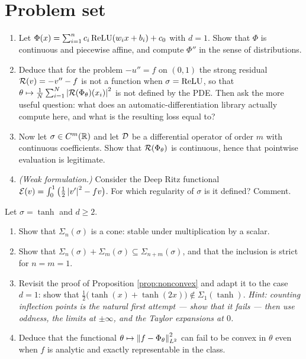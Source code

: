 \documentclass[11pt,a4paper]{article}
\begin{document}
\newpage
\section{Problem set}

\begin{exercise}\label{ex:relu}
\leavevmode
\begin{enumerate}[label=\textbf{\arabic*.}]
\item Let $\Phi(x) = \sum_{i=1}^n c_i \operatorname{ReLU}(w_i x + b_i) + c_0$ with $d = 1$. Show that $\Phi$ is
continuous and piecewise affine, and compute $\Phi''$ in the sense of distributions.
\item Deduce that for the problem $-u'' = f$ on $(0,1)$ the strong residual $\mathcal{R}(v) = -v'' - f$ is
not a function when $\sigma = \operatorname{ReLU}$, so that
$\theta \mapsto \frac1N \sum_{i=1}^N \left\lvert \mathcal{R}(\Phi_\theta)(x_i) \right\rvert^2$ is not defined by the PDE. Then
ask the more useful question: what does an automatic-differentiation library actually compute here,
and what is the resulting loss equal to?
\item Now let $\sigma \in C^m(\mathbb{R})$ and let $\mathcal{D}$ be a differential operator of order $m$ with
continuous coefficients. Show that $\mathcal{R}(\Phi_\theta)$ is continuous, hence that pointwise evaluation
is legitimate.
\item \emph{(Weak formulation.)} Consider the Deep Ritz functional
$\mathcal{E}(v) = \int_0^1 \big( \tfrac12 \left\lvert v' \right\rvert^2 - f v \big)$. For which regularity of $\sigma$ is it
defined? Comment.
\end{enumerate}
\end{exercise}

\begin{exercise}\label{ex:structure}
Let $\sigma = \tanh$ and $d \ge 2$.
\begin{enumerate}[label=\textbf{\arabic*.}]
\item Show that $\Sigma_n(\sigma)$ is a cone: stable under multiplication by a scalar.
\item Show that $\Sigma_n(\sigma) + \Sigma_m(\sigma) \subseteq \Sigma_{n+m}(\sigma)$, and that the
inclusion is strict for $n = m = 1$.
\item Revisit the proof of Proposition \ref{prop:nonconvex} and adapt it to the case $d = 1$: show
that $\tfrac12\big(\tanh(x) + \tanh(2x)\big) \notin \Sigma_1(\tanh)$.
\emph{Hint: counting inflection points is the natural first attempt --- show that it fails ---
then use oddness, the limits at $\pm\infty$, and the Taylor expansions at $0$.}
\item Deduce that the functional $\theta \mapsto \left\lVert f - \Phi_\theta \right\rVert_{L^2}^2$ can fail to be
convex in $\theta$ even when $f$ is analytic and exactly representable in the class.
\end{enumerate}
\end{exercise}
\end{document}
